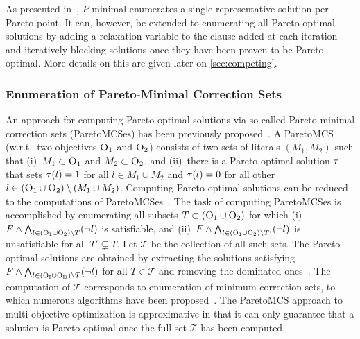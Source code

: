 As presented in~\autocite{DBLP:conf/cp/SohBTB17}, $P$-minimal enumerates a single representative solution per Pareto point.
It can, however, be extended to enumerating all Pareto-optimal solutions by adding a relaxation variable to the clause added at each iteration and iteratively blocking solutions once they have been proven to be Pareto-optimal.
More details on this are given later on \cref{sec:competing}.

\subsubsection{Enumeration of Pareto-Minimal Correction Sets\label{sec:pareto-mcs}}

An approach for computing Pareto-optimal solutions via so-called Pareto-minimal correction sets (ParetoMCSes) has been previously proposed~\autocite{DBLP:conf/ijcai/Terra-NevesLM18a,DBLP:conf/aaai/Terra-NevesLM18,DBLP:conf/ijcai/Terra-NevesLM18}.
A ParetoMCS (w.r.t.\ two objectives $\textsc{O}_1$ and $\textsc{O}_2$) consists of two sets of literals $(M_1, M_2)$ such that (i)~$M_1 \subset \textsc{O}_1$ and $M_2 \subset \textsc{O}_2$, and (ii)~there is a Pareto-optimal solution $\tau$ that sets $\tau(l) = 1$ for all $l \in M_1 \cup M_2$ and $\tau(l) = 0$ for all other $l \in (\textsc{O}_1 \cup \textsc{O}_2) \setminus (M_1 \cup M_2)$.
Computing Pareto-optimal solutions can be reduced to the computations of ParetoMCSes~\autocite{DBLP:conf/ijcai/Terra-NevesLM18a}.
The task of computing ParetoMCSes is accomplished by enumerating all subsets $T \subset  (\textsc{O}_1 \cup \textsc{O}_2)$ for which (i)~$F \land \bigwedge_{l \in  (\textsc{O}_1 \cup \textsc{O}_2) \setminus T} (\lnot l)$ is satisfiable, and (ii)~$F \land \bigwedge_{l \in  (\textsc{O}_1 \cup \textsc{O}_2) \setminus T'} (\lnot l)$ is unsatisfiable for all $T' \subsetneq T$.
Let $\mathcal{T}$ be the collection of all such sets.
The Pareto-optimal solutions are obtained by extracting the solutions satisfying $F \land \bigwedge_{l \in  (\textsc{O}_{\text{I}} \cup \textsc{O}_{\text{D}}) \setminus T} (\lnot l)$ for all $T \in \mathcal{T}$ and removing the dominated ones~\autocite{DBLP:conf/ijcai/Terra-NevesLM18a}.
The computation of $\mathcal{T}$ corresponds to enumeration of minimum correction sets, to which numerous algorithms have been proposed~\autocites{DBLP:conf/lpar/BendikC20,DBLP:conf/hvc/MorgadoLM12,DBLP:conf/sat/PrevitiMJM17}.
The ParetoMCS approach to multi-objective optimization is approximative in that it can only guarantee that a solution is Pareto-optimal once the full set $\mathcal{T}$ has been computed.

